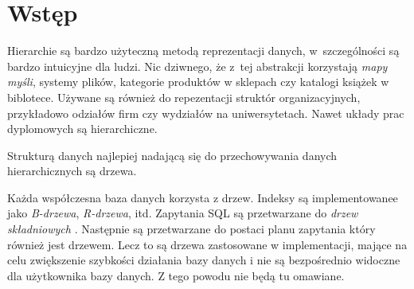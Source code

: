 \chapter{Wstęp}





% 


Hierarchie są bardzo użyteczną metodą reprezentacji danych, w~szczególności są bardzo intuicyjne dla ludzi.
Nic dziwnego, że z~tej abstrakcji korzystają \emph{mapy myśli}, systemy plików, kategorie produktów w sklepach czy katalogi książek w biblotece.
Używane są również do repezentacji struktór organizacyjnych, przykładowo odziałów firm czy wydziałów na uniwersytetach.
Nawet układy prac dyplomowych są hierarchiczne.



Strukturą danych najlepiej nadającą się do przechowywania danych hierarchicznych są drzewa.




Każda współczesna baza danych korzysta z drzew. 
Indeksy są implementowanee jako \emph{B-drzewa}, \emph{R-drzewa}, itd.
Zapytania SQL są przetwarzane do \emph{drzew składniowych} . Następnie są przetwarzane do postaci planu zapytania który również jest drzewem.
Lecz to są drzewa zastosowane w implementacji, mające na celu zwiększenie szybkości działania bazy danych i nie są bezpośrednio widoczne dla użytkownika bazy danych.
Z tego powodu nie będą tu omawiane.


